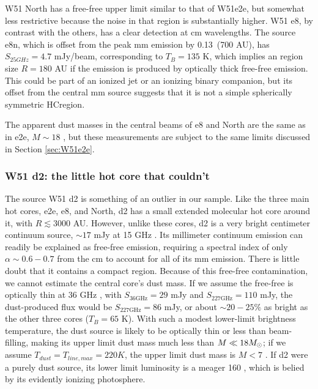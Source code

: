 \documentclass{emulateapj}
\begin{document}
W51 North has a free-free upper limit similar to that of W51e2e, but somewhat less
restrictive because the noise in that region is substantially higher.  W51 e8,
by contrast with the others, has a clear detection at cm wavelengths.  The
source e8n, which is offset from the peak mm emission by 0.13\arcsec\ (700 AU),
has $S_{25 GHz}=4.7$ mJy/beam, corresponding to $T_B=135$ K, which implies an
\hii region size $R=180$ AU if the emission is produced by  optically thick
free-free emission.  This could be part of an ionized jet or an ionizing binary
companion, but its offset from the central mm source
suggests that it is not a simple spherically symmetric HC\hii region.

The apparent dust masses in the central beams of e8 and North are the same
as in e2e, $M\sim18$ \msun, but these measurements are subject to the same
limits discussed in Section \ref{sec:W51e2e}.

\subsubsection{W51 d2: the little hot core that couldn't}
\label{sec:w51d2}
The source W51 d2 is something of an outlier in our sample.  Like the three
main hot cores, e2e, e8, and North, d2 has a small extended molecular hot core
around it, with $R\lesssim3000$ AU.  However, unlike these cores, d2 is a very
bright centimeter continuum source, $\sim17$ mJy at 15 GHz
\citep{Ginsburg2016a}.  Its millimeter continuum emission can readily be
explained as free-free emission, requiring a spectral index of only
$\alpha\sim0.6-0.7$ from the cm to account for all of its mm emission.  There
is little doubt that it contains a compact \hii region.  Because of this free-free
contamination, we cannot estimate the central core's dust mass.  If we assume
the free-free is optically thin at 36 GHz \citep[the highest-frequency cm-wave
measurement
we have available][]{Goddi2015a}, with $S_{36 \mathrm{GHz}} = 29$ mJy and
$S_{227 \mathrm{GHz}}=110$
mJy, the dust-produced flux would be $S_{227 \mathrm{GHz}} = 86$ mJy, or about
$\sim20-25\%$ as bright as the other three cores ($T_{B}=65$ K).  With such a modest
lower-limit brightness temperature, the dust source is likely to be optically
thin or less than beam-filling, making its upper limit dust mass much less than
$M\ll18M_{\odot}$; if we assume $T_{dust} = T_{line,max} = 220 K$, the upper limit
dust mass is $M<7$ \msun.  If d2 were a purely dust source, its lower limit
luminosity is a meager 160 \lsun, which is belied by its evidently ionizing
photosphere.
\end{document}
